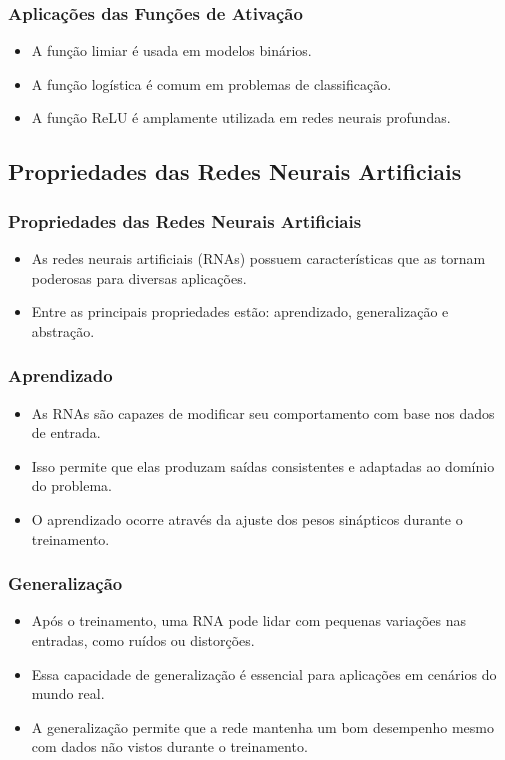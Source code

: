 \documentclass{beamer}
\begin{document}
\begin{frame}
\frametitle{Aplicações das Funções de Ativação}
\begin{itemize}
    \item A função limiar é usada em modelos binários.
    \item A função logística é comum em problemas de classificação.
    \item A função ReLU é amplamente utilizada em redes neurais profundas.
\end{itemize}
\end{frame}

\subsection{Propriedades das Redes Neurais Artificiais}
\begin{frame}
\frametitle{Propriedades das Redes Neurais Artificiais}
\begin{itemize}
    \item As redes neurais artificiais (RNAs) possuem características que as tornam poderosas para diversas aplicações.
    \item Entre as principais propriedades estão: aprendizado, generalização e abstração.
\end{itemize}
\end{frame}

\begin{frame}
\frametitle{Aprendizado}
\begin{itemize}
    \item As RNAs são capazes de modificar seu comportamento com base nos dados de entrada.
    \item Isso permite que elas produzam saídas consistentes e adaptadas ao domínio do problema.
    \item O aprendizado ocorre através da ajuste dos pesos sinápticos durante o treinamento.
\end{itemize}
\end{frame}

\begin{frame}
\frametitle{Generalização}
\begin{itemize}
    \item Após o treinamento, uma RNA pode lidar com pequenas variações nas entradas, como ruídos ou distorções.
    \item Essa capacidade de generalização é essencial para aplicações em cenários do mundo real.
    \item A generalização permite que a rede mantenha um bom desempenho mesmo com dados não vistos durante o treinamento.
\end{itemize}
\end{frame}
\end{document}
